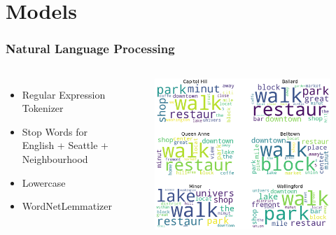 \documentclass{beamer}
\begin{document}

\section{Models}


\begin{frame}
\frametitle{Natural Language Processing}
\begin{columns}[c] %

\begin{itemize}
\item Regular Expression Tokenizer
\item Stop Words for English + Seattle + Neighbourhood
\item Lowercase
\item WordNetLemmatizer
\end{itemize}

\begin{figure}
\includegraphics[width=0.8\linewidth]{photo/13_wordclouds}
\end{figure}

\end{columns}
\end{frame}

\end{document}
